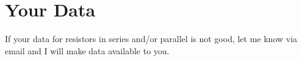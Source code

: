 \section{Your Data}
%
If your data for resistors in series and/or parallel is not good, let me know via email and I will make data available to you.
%
%
\newpage
